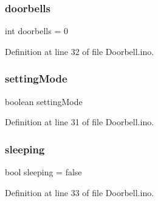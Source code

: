 \subsubsection{\texorpdfstring{doorbells}{doorbells}}
{\footnotesize\ttfamily int doorbells = 0}



Definition at line 32 of file Doorbell.\+ino.

\mbox{\label{_doorbell_8ino_a5c64e18eb1e6df97544212e53facd531}} 
\subsubsection{\texorpdfstring{settingMode}{settingMode}}
{\footnotesize\ttfamily boolean setting\+Mode}



Definition at line 31 of file Doorbell.\+ino.

\mbox{\label{_doorbell_8ino_afc77d1fb95870b5511dffff362261cb6}} 
\subsubsection{\texorpdfstring{sleeping}{sleeping}}
{\footnotesize\ttfamily bool sleeping = false}



Definition at line 33 of file Doorbell.\+ino.

